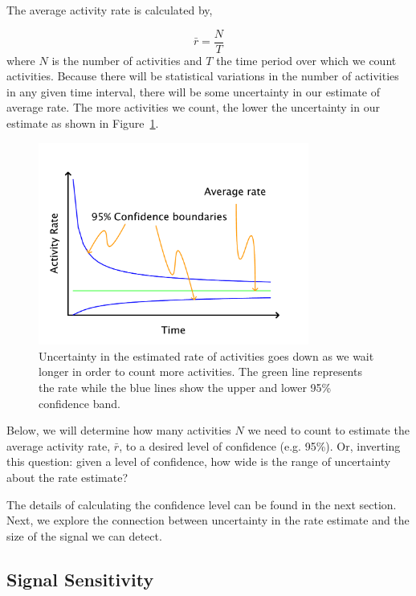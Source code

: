 \documentclass{article}
\begin{document}
The average activity rate is calculated by,

\begin{equation}
    \label{eq:rateEst}
    \bar{r} = \frac{N}{T}
\end{equation}
where $N$ is the number of activities and $T$ the time period over which we count activities.  Because there will be statistical
variations in the number of activities in any given time interval, there will be some uncertainty in our estimate of average rate. 
The more activities we count, the lower the uncertainty in our estimate as shown in Figure~\ref{fig:confidence}.

%
\begin{figure}[h]
	\begin{center}
		\includegraphics[width=3.5in]{./imgs/fig2.pdf}
	\end{center}
	\caption{Uncertainty in the estimated rate of activities goes down as we wait longer in order to count more activities.  The green line
represents the rate while the blue lines show the upper and lower 95\% confidence band. }
    	\label{fig:confidence}
\end{figure}
%
%

Below, we will determine how many activities $N$ we need to count to estimate the average activity rate, $\bar{r}$, to a desired level
of confidence (e.g. 95\%). Or, inverting this question: given a level of confidence, how wide is the range of uncertainty
about the rate estimate?

The details of calculating the confidence level can be found in the next section.  Next, we explore the connection between
uncertainty in the rate estimate and the size of the signal we can detect.


\subsection{Signal Sensitivity}
\end{document}
